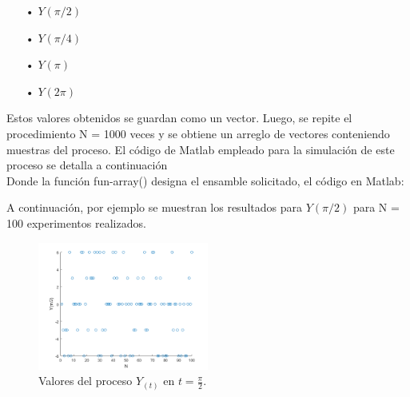 \begin{enumerate}
   \item[•] $Y(\pi/2)$
   \item[•] $Y(\pi/4)$
   \item[•] $Y(\pi)$
   \item[•] $Y(2\pi)$
\end{enumerate}

Estos valores obtenidos se guardan como un vector. Luego, se repite el procedimiento N = 1000 veces 
y se obtiene un arreglo de vectores conteniendo muestras del proceso.
El código de Matlab empleado para la simulación de este proceso se detalla a continuación 
\\




Donde la función fun-array() designa el ensamble solicitado, el código en Matlab:



A continuación, por ejemplo se muestran los resultados para $Y(\pi/2)$ para N = 100 experimentos realizados.

\begin{figure}[H]
\centering
	\includegraphics[width=0.5\textwidth, trim = {0 0 0 0},clip]{./ImagenesEjercicio1/ypi_2.png}
	\caption{Valores del proceso $Y_(t)$ en $t = \frac{\pi}{2} $.}
	\label{fig:ypi_2}
\end{figure}

